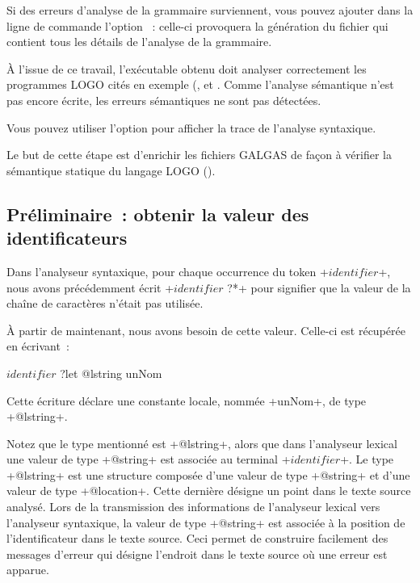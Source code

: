 Si des erreurs d'analyse de la grammaire surviennent, vous pouvez ajouter dans la ligne de commande l'option ~: celle-ci provoquera la génération du fichier \- qui contient tous les détails de l'analyse de la grammaire.

À l'issue de ce travail, l'exécutable obtenu doit analyser correctement les programmes LOGO cités en exemple (,   et . Comme l'analyse sémantique n'est pas encore écrite, les erreurs sémantiques ne sont pas détectées.

Vous pouvez utiliser l'option  pour afficher la trace de l'analyse syntaxique.








Le but de cette étape est d'enrichir les fichiers GALGAS de façon à vérifier la sémantique statique du langage LOGO ().

\subsection{Préliminaire~: obtenir la valeur des identificateurs}

Dans l’analyseur syntaxique, pour chaque occurrence du token \ggsq+$identifier$+, nous avons précédemment écrit \ggsq+$identifier$ ?*+ pour signifier que la valeur de la chaîne de caractères n’était pas utilisée.

À partir de maintenant, nous avons besoin de cette valeur. Celle-ci est récupérée en écrivant~:

\begin{galgas4}
$identifier$ ?let @lstring unNom
\end{galgas4}


Cette écriture déclare une constante locale, nommée \ggsq+unNom+, de type \ggsq+@lstring+.

Notez que le type mentionné est \ggsq+@lstring+, alors que dans l’analyseur lexical une valeur de type \ggsq+@string+ est associée au terminal \ggsq+$identifier$+. Le type \ggsq+@lstring+ est une structure composée d’une valeur de type \ggsq+@string+ et d’une valeur de type \ggsq+@location+. Cette dernière désigne un point dans le texte source analysé. Lors de la transmission des informations de l’analyseur lexical vers l’analyseur syntaxique, la valeur de type \ggsq+@string+ est associée à la position de l’identificateur dans le texte source. Ceci permet de construire facilement des messages d’erreur qui désigne l’endroit dans le texte source où une erreur est apparue.

